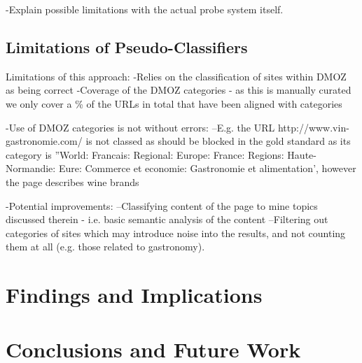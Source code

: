 \documentclass{bmcart}
\begin{document}
-Explain possible limitations with the actual probe system itself.


\subsection*{Limitations of Pseudo-Classifiers}
Limitations of this approach:
-Relies on the classification of sites within DMOZ as being correct
-Coverage of the DMOZ categories - as this is manually curated we only cover a \% of the URLs in total that have been aligned with categories

-Use of DMOZ categories is not without errors:
--E.g. the URL http://www.vin-gastronomie.com/ is not classed as should be blocked in the gold standard as its category is ''World: Francais: Regional: Europe: France: Regions: Haute-Normandie: Eure: Commerce et economie: Gastronomie et alimentation', however the page describes wine brands

-Potential improvements:
--Classifying content of the page to mine topics discussed therein - i.e. basic semantic analysis of the content
--Filtering out categories of sites which may introduce noise into the results, and not counting them at all (e.g. those related to gastronomy).


\section*{Findings and Implications}


\section*{Conclusions and Future Work}
\end{document}
